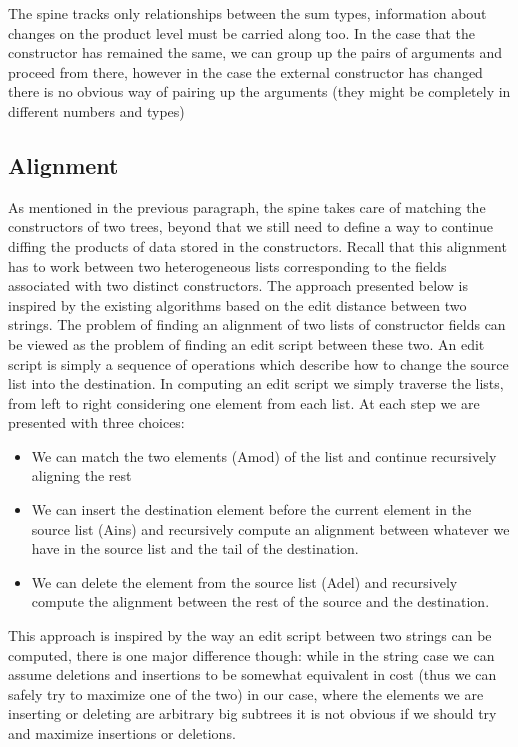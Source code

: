 \documentclass[11pt]{article}
\begin{document}
The spine tracks only relationships between the sum types, information
about changes on the product level must be carried along too. In the
case that the constructor has remained the same, we can group up the
pairs of arguments and proceed from there, however in the case the
external constructor has changed there is no obvious way of pairing up
the arguments (they might be completely in different numbers and types)

\subsection{Alignment}\label{alignment}

As mentioned in the previous paragraph, the spine takes care of matching
the constructors of two trees, beyond that we still need to define a way
to continue diffing the products of data stored in the constructors.
Recall that this alignment has to work between two heterogeneous lists
corresponding to the fields associated with two distinct constructors.
The approach presented below is inspired by the existing algorithms
based on the edit distance between two strings. The problem of finding
an alignment of two lists of constructor fields can be viewed as the
problem of finding an edit script between these two. An edit script is
simply a sequence of operations which describe how to change the source
list into the destination. In computing an edit script we simply
traverse the lists, from left to right considering one element from each
list. At each step we are presented with three choices:

\begin{itemize}
\item
  We can match the two elements (Amod) of the list and continue
  recursively aligning the rest
\item
  We can insert the destination element before the current element in
  the source list (Ains) and recursively compute an alignment between
  whatever we have in the source list and the tail of the destination.
\item
  We can delete the element from the source list (Adel) and recursively
  compute the alignment between the rest of the source and the
  destination.
\end{itemize}

This approach is inspired by the way an edit script between two strings
can be computed, there is one major difference though: while in the
string case we can assume deletions and insertions to be somewhat
equivalent in cost (thus we can safely try to maximize one of the two)
in our case, where the elements we are inserting or deleting are
arbitrary big subtrees it is not obvious if we should try and maximize
insertions or deletions.
\end{document}
